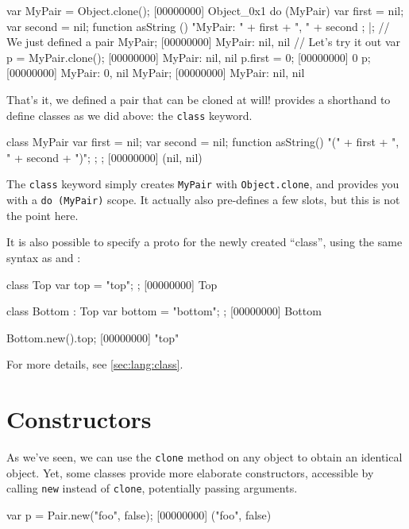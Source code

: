 \begin{urbiscript}[firstnumber=1]
var MyPair = Object.clone();
[00000000] Object_0x1
do (MyPair)
{
  var first = nil;
  var second = nil;
  function asString ()
  {
    "MyPair: " + first + ", " + second
  };
}|;
// We just defined a pair
MyPair;
[00000000] MyPair: nil, nil
// Let's try it out
var p = MyPair.clone();
[00000000] MyPair: nil, nil
p.first = 0;
[00000000] 0
p;
[00000000] MyPair: 0, nil
MyPair;
[00000000] MyPair: nil, nil
\end{urbiscript}

That's it, we defined a pair that can be cloned at will! \us provides a
shorthand to define classes as we did above: the \lstinline{class} keyword.

\begin{urbiscript}[firstnumber=1]
class MyPair
{
  var first = nil;
  var second = nil;
  function asString() { "(" + first + ", " + second + ")"; };
};
[00000000] (nil, nil)
\end{urbiscript}

The \lstinline{class} keyword simply creates \lstinline|MyPair| with
\lstinline|Object.clone|, and provides you with a \lstinline|do (MyPair)|
scope. It actually also pre-defines a few slots, but this is not the point
here.

It is also possible to specify a proto for the newly created ``class'',
using the same syntax as \Java and \Cxx:

\begin{urbiscript}
class Top
{
  var top = "top";
};
[00000000] Top

class Bottom : Top
{
  var bottom = "bottom";
};
[00000000] Bottom

Bottom.new().top;
[00000000] "top"
\end{urbiscript}

For more details, see \autoref{sec:lang:class}.

\section{Constructors}
\label{sec:tut:ctor}
As we've seen, we can use the \lstinline|clone| method on any object to
obtain an identical object. Yet, some classes provide more elaborate
constructors, accessible by calling \lstinline{new} instead of
\lstinline{clone}, potentially passing arguments.

\begin{urbiscript}[firstnumber=1]
var p = Pair.new("foo", false);
[00000000] ("foo", false)
\end{urbiscript}

